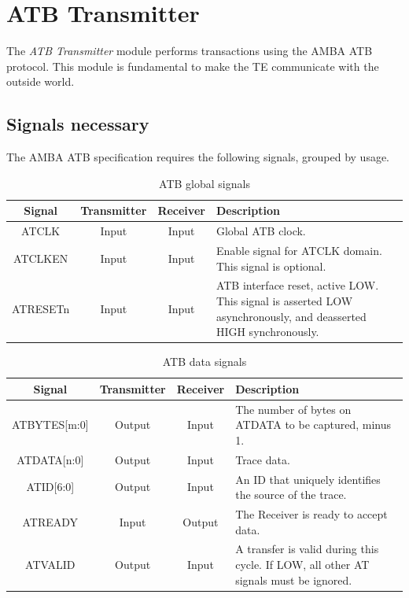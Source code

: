 \chapter{ATB Transmitter}\label{atb_transmitter}

The \textit{ATB Transmitter} module performs transactions using the AMBA ATB protocol.
This module is fundamental to make the TE communicate with the outside world.

\section{Signals necessary}
The AMBA ATB specification requires the following signals, grouped by usage.

\begin{table}[H]
    \centering 
    \begin{tabularx}{\textwidth}{|c|c|c|>{\centering\arraybackslash}X|}
        \hline
        Signal      & Transmitter   & Receiver  & Description \\ \hline
        ATCLK       & Input         & Input     & Global ATB clock. \\ \hline
        ATCLKEN     & Input         & Input     & Enable signal for ATCLK domain. This signal is 
                                                  optional.\\ \hline
        ATRESETn    & Input         & Input     & ATB interface reset, active LOW. This signal is 
                                                  asserted LOW asynchronously, and deasserted 
                                                  HIGH synchronously. \\ \hline
    \end{tabularx}
    \caption{ATB global signals} 
    \label{tab:global_signals}
\end{table}

\begin{table}[H]
    \centering 
    \begin{tabularx}{\textwidth}{|c|c|c|>{\centering\arraybackslash}X|}
        \hline
        Signal          & Transmitter   & Receiver  & Description \\ \hline
        ATBYTES[m:0]    & Output        & Input     & The number of bytes on ATDATA to be 
                                                      captured, minus 1. \\ \hline
        ATDATA[n:0]     & Output        & Input     & Trace data. \\ \hline
        ATID[6:0]       & Output        & Input     & An ID that uniquely identifies the source 
                                                      of the trace. \\ \hline
        ATREADY         & Input         & Output    & The Receiver is ready to accept data. \\ \hline
        ATVALID         & Output        & Input     & A transfer is valid during this cycle. If 
                                                      LOW, all other AT signals must be ignored. \\ \hline
    \end{tabularx}
    \caption{ATB data signals} 
    \label{tab:data_signals}
\end{table}

